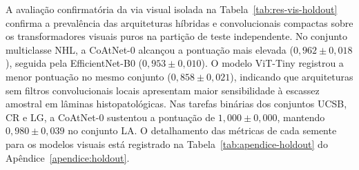 \begin{table}[htb]
\centering
\caption{F1 macro (média $\pm$ desvio padrão ao longo de 5 sementes) no conjunto de teste independente (20\% dos dados) para as arquiteturas da via visual.}
\label{tab:res-vis-holdout}
\small
{}
\end{table}

A avaliação confirmatória da via visual isolada na Tabela~\ref{tab:res-vis-holdout} confirma a prevalência das arquiteturas híbridas e convolucionais compactas sobre os transformadores visuais puros na partição de teste independente. No conjunto multiclasse NHL, a CoAtNet-0 alcançou a pontuação mais elevada ($0{,}962 \pm 0{,}018$), seguida pela EfficientNet-B0 ($0{,}953 \pm 0{,}010$). O modelo ViT-Tiny registrou a menor pontuação no mesmo conjunto ($0{,}858 \pm 0{,}021$), indicando que arquiteturas sem filtros convolucionais locais apresentam maior sensibilidade à escassez amostral em lâminas histopatológicas. Nas tarefas binárias dos conjuntos UCSB, CR e LG, a CoAtNet-0 sustentou a pontuação de $1{,}000 \pm 0{,}000$, mantendo $0{,}980 \pm 0{,}039$ no conjunto LA. O detalhamento das métricas de cada semente para os modelos visuais está registrado na Tabela~\ref{tab:apendice-holdout} do Apêndice~\ref{apendice:holdout}.

